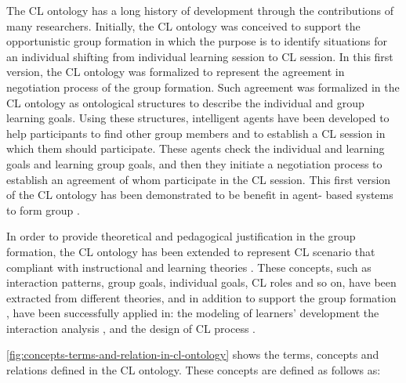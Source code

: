 The CL ontology has a long history of development through the contributions of many researchers. Initially, the CL ontology was conceived to support the opportunistic group formation \cite{IkedaGoMizoguchi1997} in which the purpose is to identify situations for an individual shifting from individual learning session to CL session. In this first version, the CL ontology was formalized to represent the agreement in negotiation process of the group formation. Such agreement was formalized in the CL ontology as ontological structures to describe the individual and group learning goals. Using these structures, intelligent agents have been developed to help participants to find other group members and to establish a CL session in which them should participate. These agents check the individual and learning goals and learning group goals, and then they initiate a negotiation process to establish an agreement of whom participate in the CL session. This first version of the CL ontology has been demonstrated to be benefit in agent- based systems to form group \cite{InabaOhkuboIkedaMizoguchiToyoda2001, SupnithiInabaIkedaMizoguchi1999}.

In order to provide theoretical and pedagogical justification in the group formation, the CL ontology has been extended to represent CL scenario that compliant with instructional and learning theories \cite{InabaMizoguchi2004,IsotaniMizoguchiIsotaniCapeliIsotanideAlbuquerqueBittencourtJaques2013}. These concepts, such as interaction patterns, group goals, individual goals, CL roles and so on, have been extracted from different theories, and in addition to support the group formation \cite{IsotaniMizoguchi2008}, have been successfully applied in: the modeling of learners' development \cite{InabaIkedaMizoguchi2003} the interaction analysis \cite{InabaOhkuboIkedaMizoguchi2002}, and the design of CL process \cite{IsotaniMizoguchiIsotaniCapeliIsotanideAlbuquerqueBittencourtJaques2013}.

\autoref{fig:concepts-terms-and-relation-in-cl-ontology} shows the terms, concepts and relations defined in the CL ontology. These concepts are defined as follows as:

